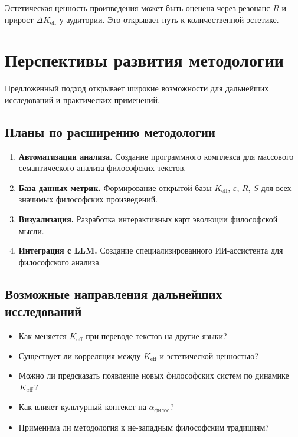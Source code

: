 \documentclass[12pt,a4paper]{article}
\newcommand{\eps}{\varepsilon}
\begin{document}
	Эстетическая ценность произведения может быть оценена через резонанс \(R\) и прирост \(\Delta K_{\mathrm{eff}}\) у аудитории. Это открывает путь к количественной эстетике.
	
	\section{Перспективы развития методологии}
	\label{sec:future-directions}
	
	Предложенный подход открывает широкие возможности для дальнейших исследований и практических применений.
	
	\subsection{Планы по расширению методологии}
	
	\begin{enumerate}
		\item \textbf{Автоматизация анализа.} Создание программного комплекса для массового семантического анализа философских текстов.
		\item \textbf{База данных метрик.} Формирование открытой базы \(K_{\mathrm{eff}}\), \(\eps\), \(R\), \(S\) для всех значимых философских произведений.
		\item \textbf{Визуализация.} Разработка интерактивных карт эволюции философской мысли.
		\item \textbf{Интеграция с LLM.} Создание специализированного ИИ-ассистента для философского анализа.
	\end{enumerate}
	
	\subsection{Возможные направления дальнейших исследований}
	
	\begin{itemize}
		\item Как меняется \(K_{\mathrm{eff}}\) при переводе текстов на другие языки?
		\item Существует ли корреляция между \(K_{\mathrm{eff}}\) и эстетической ценностью?
		\item Можно ли предсказать появление новых философских систем по динамике \(\Keff\)?
		\item Как влияет культурный контекст на \(\alpha_{\text{филос}}\)?
		\item Применима ли методология к не-западным философским традициям?
	\end{itemize}
	
\end{document}

